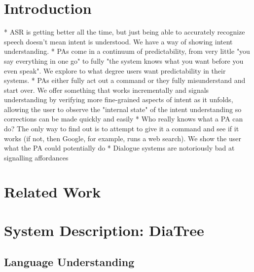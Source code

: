 \documentclass[a4paper,11pt]{article}
\title{}
\author{Casey Kennington \and David Schlangen}
\begin{document}

\maketitle

\begin{abstract}

\end{abstract}

\section{Introduction}
\label{section:intro}



* ASR is getting better all the time, but just being able to accurately recognize speech doesn't mean intent is understood. We have a way of showing intent understanding. 
* PAs come in a continuum of predictability, from very little "you say everything in one go" to fully "the system knows what you want before you even speak". We explore to what degree users want predictability in their systems.
* PAs either fully act out a command or they fully misunderstand and start over.  We offer something that works incrementally and signals understanding by verifying more fine-grained aspects of intent as it unfolds, allowing the user to observe the "internal state" of the intent understanding so corrections can be made quickly and easily
* Who really knows what a PA can do? The only way to find out is to attempt to give it a command and see if it works (if not, then Google, for example, runs a web search). We show the user what the PA could potentially do
* Dialogue systems are notoriously bad at signalling affordances


\section{Related Work}
\label{section:related_work}


\section{System Description: DiaTree}
\label{section:system_def}

\subsection{Language Understanding}
\end{document}
